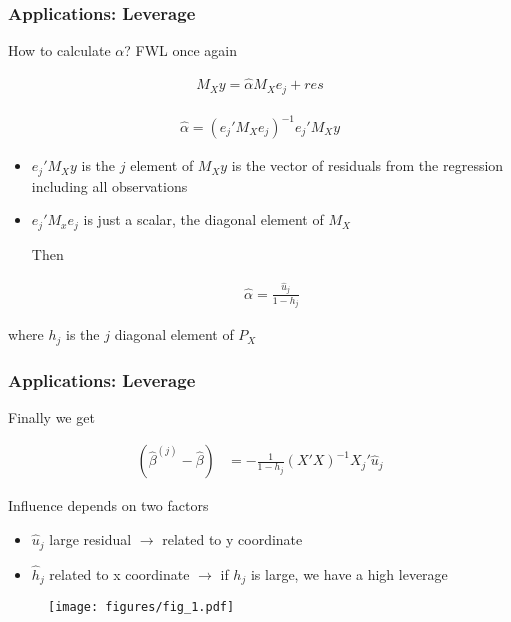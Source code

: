 \documentclass[
  shownotes,
  xcolor={svgnames},
  hyperref={colorlinks,citecolor=DarkBlue,linkcolor=DarkRed,urlcolor=DarkBlue}
  ]{beamer}
\begin{document}
\begin{frame}
\frametitle{Applications: Leverage}
How to calculate $\alpha$? FWL once again

\begin{align}
M_X y =\hat\alpha M_X e_j + res
\end{align}

\begin{align}
\hat\alpha = (e_j'M_X e_j)^{-1}  e_j'M_X y  
\end{align}

\begin{itemize}
\item $e_j'M_X y $ is the $j$ element of $M_Xy$ is the vector of residuals from the regression including all observations
\item $e_j'M_xe_j$ is just a scalar, the diagonal element of $M_X$

Then 

\begin{align}
\hat\alpha = \frac{\hat u_j}{1-h_j}
\end{align}
\end{itemize}

where $h_j$ is the $j$ diagonal element of $P_X$


\end{frame}
\begin{frame}
\frametitle{Applications: Leverage}
Finally we get 

\begin{align}
  (\hat \beta^{(j)} - \hat \beta)&= - \frac{1}{1-h_j} (X'X)^{-1}X_j'\hat u_j
\end{align}

Influence depends on two factors
\begin{itemize}
  \item $\hat u_j$ large residual $\rightarrow$ related to y coordinate
  \item $\hat h_j$ related to x coordinate $\rightarrow$ if $h_j$ is large, we have a high leverage
\end{itemize}

\begin{figure}[H] \centering
  \centering
  \texttt{[image: figures/fig\_1.pdf]}
  \\
  \tiny
\end{figure}
\end{frame}
\end{document}
